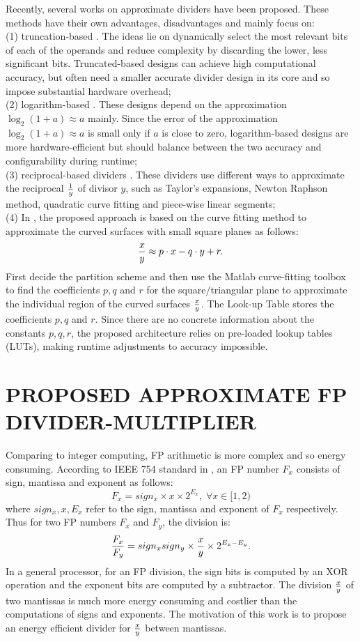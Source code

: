 \documentclass[conference]{IEEEtran}
\begin{document}
Recently, several works on approximate dividers have been proposed. These methods have their own advantages, disadvantages and mainly focus on:
\\
(1) truncation-based \cite{LChen,SHashemi3,HJiang9}. The ideas lie on dynamically select the most relevant bits of each of the operands and reduce complexity by discarding the lower, less significant bits. Truncated-based designs can achieve high computational accuracy, but often need  a smaller accurate divider design in its core and so impose substantial
hardware overhead;\\
(2) logarithm-based \cite{HSaadat1,MImani4,OGRatnaparkhi5}. These designs depend on the approximation $\log_{2}(1+a)\approx a$ mainly. Since the error of the approximation $\log_{2}(1+a)\approx a$ is small only if $a$ is close to zero, logarithm-based designs are more hardware-efficient but should balance between the two accuracy and configurability during runtime;\\
(3) reciprocal-based dividers \cite{JMelchert2,JOelund6,Bhargav,CWen,HLiu}. These dividers use different ways to approximate the reciprocal
${1\over y}$ of divisor $y$, such as Taylor's expansions\cite{JMelchert2}, Newton Raphson method\cite{Bhargav}, quadratic curve fitting\cite{HLiu} and piece-wise linear segments\cite{CWen};\\
(4) In \cite{LWu15}, the proposed approach is based on the curve fitting method to approximate the curved surfaces with small square planes as follows:
$${x\over y}\approx p\cdot x-q\cdot y+r.$$
First decide the partition scheme and then use the Matlab curve-fitting toolbox to find the coefficients $p, q$ and $r$ for the
square/triangular plane to approximate the individual region of the curved surfaces ${x\over y}$. The Look-up Table stores the coefficients
$p, q$ and $r$. Since there are no concrete information about the constants $p, q, r$,  the proposed architecture relies on pre-loaded lookup tables (LUTs), making runtime adjustments to accuracy impossible.

\section{PROPOSED APPROXIMATE FP DIVIDER-MULTIPLIER}
\label{AppDivider3}
Comparing to integer computing, FP arithmetic is more complex and so energy consuming. According to IEEE 754 standard in \cite{Ieee}, an FP number $F_{x} $ consists of
sign, mantissa and exponent as follows:
\[F_{x}=sign_{x}\times x\times 2^{E_{x}},\;\forall x\in [1, 2)\]
where $sign_{x}, x, E_{x}$ refer to the sign, mantissa and exponent of $F_{x}$ respectively. Thus for two FP numbers $F_{x}$ and $F_{y}$, the division is:
$${F_{x}\over F_{y}}=sign_{x}sign_{y}\times {x\over y}\times 2^{E_{x}-E_{y}}.$$
In a general processor, for an FP division, the sign bits is computed by an XOR operation and the exponent bits are computed by a subtractor. The division ${x\over y}$ of two mantissas is much more energy consuming and costlier than the computations of signs and exponents. The motivation of this work is to propose an energy efficient divider for ${x\over y}$ between mantissas.
\end{document}
